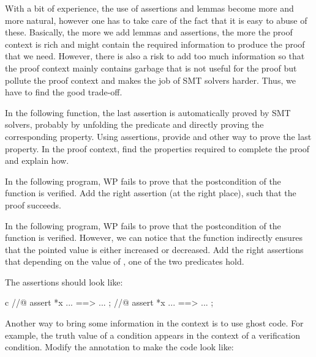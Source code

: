 With a bit of experience, the use of assertions and lemmas become more and more
natural, however one has to take care of the fact that it is easy to abuse of
these. Basically, the more we add lemmas and assertions, the more the proof
context is rich and might contain the required information to produce the proof
that we need. However, there is also a risk to add too much information so that
the proof context mainly contains garbage that is not useful for the proof but
pollute the proof context and makes the job of SMT solvers harder. Thus, we have
to find the good trade-off.






In the following function, the last assertion is automatically proved by SMT
solvers, probably by unfolding the predicate and directly proving the
corresponding property. Using assertions, provide and other way to prove the
last property. In the proof context, find the properties required to complete
the proof and explain how.






In the following program, WP fails to prove that the postcondition of the
function  is verified. Add the right assertion (at the right
place), such that the proof succeeds.






In the following program, WP fails to prove that the postcondition of the
function  is verified. However, we can notice that the
 function indirectly ensures that the pointed value is either
increased or decreased. Add the right assertions that depending on the value
of , one of the two predicates hold.




The assertions should look like:


\begin{CodeBlock}{c}
//@ assert *x ... ==> ... ;
//@ assert *x ... ==> ... ;
\end{CodeBlock}


Another way to bring some information in the context is to use ghost code.
For example, the truth value of a condition appears in the context of a
verification condition. Modify the annotation to make the code look like:

